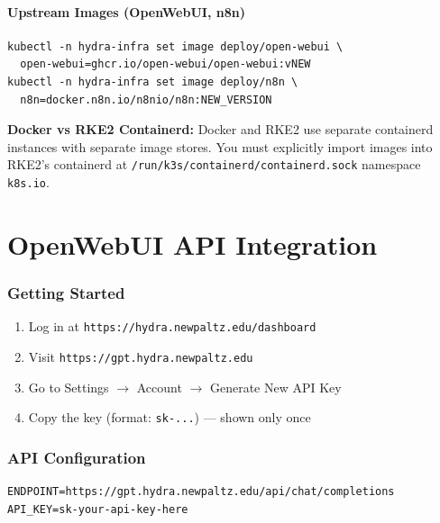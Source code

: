 \documentclass[11pt,a4paper]{article}
\begin{document}
\subsection{Upstream Images (OpenWebUI, n8n)}

\begin{lstlisting}[style=bash]
kubectl -n hydra-infra set image deploy/open-webui \
  open-webui=ghcr.io/open-webui/open-webui:vNEW
kubectl -n hydra-infra set image deploy/n8n \
  n8n=docker.n8n.io/n8nio/n8n:NEW_VERSION
\end{lstlisting}

\begin{warningbox}
\textbf{Docker vs RKE2 Containerd:} Docker and RKE2 use separate containerd instances with separate image stores. You must explicitly import images into RKE2's containerd at \texttt{/run/k3s/containerd/containerd.sock} namespace \texttt{k8s.io}.
\end{warningbox}

\newpage
\part{OpenWebUI API Integration}

\section{Getting Started}

\begin{enumerate}
    \item Log in at \texttt{https://hydra.newpaltz.edu/dashboard}
    \item Visit \texttt{https://gpt.hydra.newpaltz.edu}
    \item Go to Settings $\to$ Account $\to$ Generate New API Key
    \item Copy the key (format: \texttt{sk-...}) --- shown only once
\end{enumerate}

\section{API Configuration}

\begin{lstlisting}[style=bash]
ENDPOINT=https://gpt.hydra.newpaltz.edu/api/chat/completions
API_KEY=sk-your-api-key-here
\end{lstlisting}
\end{document}
